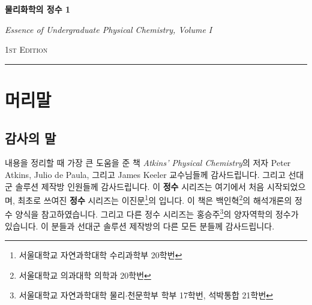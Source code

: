 \documentclass[10pt]{book}
\begin{document}
\frontmatter
\pagestyle{empty}
\begin{titlepage}
    \vspace*{2cm}
    
    \noindent
    \vspace*{0.5cm}
    {\Huge \bf 물리화학의 정수 1}
    
    \vspace{1.5cm}
    \epigraph{{\it \large Essence of Undergraduate Physical Chemistry, Volume I}}%
    { \textsc{1st Edition}}
    \null\vfill
    \vspace*{1cm}
    \noindent
    \hfill
    \begin{minipage}{0.7\linewidth}
        \begin{flushright}
            \printauthordate
        \end{flushright}
    \end{minipage}
    \begin{minipage}{0.02\linewidth}
        \rule{1pt}{70pt}
    \end{minipage}
    \titlepagedecoration
\end{titlepage}

\pagestyle{plain}
\chapter*{머리말}
    \section{감사의 말}
        \hspace{\parindent} 내용을 정리할 때 가장 큰 도움을 준 책 \textit{Atkins' Physical Chemistry}의 저자 Peter Atkins, Julio de Paula, 그리고 James Keeler 교수님들께 감사드립니다. 그리고 선대군 솔루션 제작방 인원들께 감사드립니다. 이 \textbf{정수} 시리즈는 여기에서 처음 시작되었으며, 최초로 쓰여진 \textbf{정수} 시리즈는 이진문\footnote[1]{서울대학교 자연과학대학 수리과학부 20학번}의 \cite{LeeEssTop}입니다. 이 책은 백인혁\footnote[2]{서울대학교 의과대학 의학과 20학번}의 해석개론의 정수\cite{BaekEssUGAna} 양식을 참고하였습니다. 그리고 다른 정수 시리즈는 홍승주\footnote[3]{서울대학교 자연과학대학 물리$\cdot$천문학부 학부 17학번, 석박통합 21학번}의 양자역학의 정수\cite{HongEssQPhys}가 있습니다. 이 분들과 선대군 솔루션 제작방의 다른 모든 분들께 감사드립니다.
\end{document}
